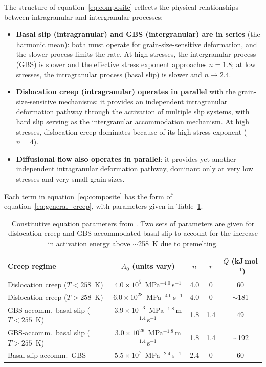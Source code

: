 \documentclass[11pt]{article}
\begin{document}
\medskip
\noindent The structure of equation~\eqref{eq:composite} reflects the physical relationships between intragranular and intergranular processes:
\begin{itemize}
  \item \textbf{Basal slip (intragranular) and GBS (intergranular) are in series} (the harmonic mean): both must operate for grain-size-sensitive deformation, and the slower process limits the rate.  At high stresses, the intergranular process (GBS) is slower and the effective stress exponent approaches $n = 1.8$; at low stresses, the intragranular process (basal slip) is slower and $n \to 2.4$.
  \item \textbf{Dislocation creep (intragranular) operates in parallel} with the grain-size-sensitive mechanisms: it provides an independent intragranular deformation pathway through the activation of multiple slip systems, with hard slip serving as the intergranular accommodation mechanism.  At high stresses, dislocation creep dominates because of its high stress exponent ($n = 4$).
  \item \textbf{Diffusional flow also operates in parallel}: it provides yet another independent intragranular deformation pathway, dominant only at very low stresses and very small grain sizes.
\end{itemize}

\noindent Each term in equation~\eqref{eq:composite} has the form of equation~\eqref{eq:general_creep}, with parameters given in Table~\ref{tab:parameters}.

\begin{table}[ht]
\centering
\caption{Constitutive equation parameters from \cite{GoldsbyKohlstedt2001}.  Two sets of parameters are given for dislocation creep and GBS-accommodated basal slip to account for the increase in activation energy above $\sim$258~K due to premelting.}
\label{tab:parameters}
\begin{tabular}{lcccc}
\toprule
\textbf{Creep regime} & $A_0$ (units vary) & $n$ & $r$ & $Q$ (kJ\,mol$^{-1}$) \\
\midrule
Dislocation creep ($T < 258$~K) & $4.0 \times 10^5$~MPa$^{-4.0}$\,s$^{-1}$ & 4.0 & 0 & 60 \\
Dislocation creep ($T > 258$~K) & $6.0 \times 10^{28}$~MPa$^{-4.0}$\,s$^{-1}$ & 4.0 & 0 & $\sim$181 \\
GBS-accomm.\ basal slip ($T < 255$~K) & $3.9 \times 10^{-3}$~MPa$^{-1.8}$\,m$^{1.4}$\,s$^{-1}$ & 1.8 & 1.4 & 49 \\
GBS-accomm.\ basal slip ($T > 255$~K) & $3.0 \times 10^{26}$~MPa$^{-1.8}$\,m$^{1.4}$\,s$^{-1}$ & 1.8 & 1.4 & $\sim$192 \\
Basal-slip-accomm.\ GBS & $5.5 \times 10^{7}$~MPa$^{-2.4}$\,s$^{-1}$ & 2.4 & 0 & 60 \\
\bottomrule
\end{tabular}
\end{table}
\end{document}
